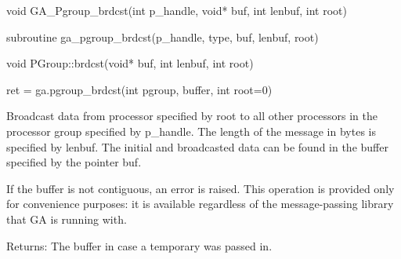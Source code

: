 \documentclass[10pt]{article}
\begin{document}
\begin{capi}
\begin{ccode}
void GA_Pgroup_brdcst(int p_handle, void* buf, int lenbuf, int root)
\end{ccode}
\begin{funcargs}
\end{funcargs}
\end{capi}

\begin{fapi}
\begin{fcode}
subroutine ga_pgroup_brdcst(p_handle, type, buf, lenbuf, root)
\end{fcode}
\begin{funcargs}
\end{funcargs}
\end{fapi}

\begin{cxxapi}
\begin{cxxcode}
void PGroup::brdcst(void* buf, int lenbuf, int root)
\end{cxxcode}
\begin{funcargs}
\end{funcargs}
\end{cxxapi}

\begin{pyapi}
\begin{pycode}
ret = ga.pgroup_brdcst(int pgroup, buffer, int root=0)
\end{pycode}
\begin{funcargs}
\end{funcargs}
\end{pyapi}

\gcoll

\begin{desc}
Broadcast data from processor specified by root to all other processors in the
processor group specified by p_handle. The length of the message in bytes is
specified by lenbuf. The initial and broadcasted data can be found in the
buffer specified by the pointer buf.

If the buffer is not contiguous, an error is raised. This operation is provided
only for convenience purposes: it is available regardless of the
message-passing library that GA is running with.

Returns: The buffer in case a temporary was passed in.
\end{desc}
\end{document}
